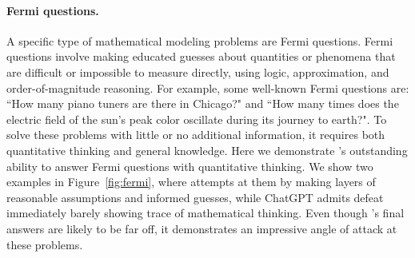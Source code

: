 \begin{comment}
A simple mathematical model to illustrate this could look like this:

Let's assume a company's pre-tax profits are \$100 million and they use robots, leading to a tax bill of \$10 million. The company's post-tax profits would now be \$90 million. If the government were to use this additional revenue to fund social programs, it could result in an increase in the income of lower-income workers.

This simple model assumes that the tax revenue is used effectively to reduce income inequality, which may not always be the case in reality. However, it illustrates the potential impact that taxation on using robots can have on income inequality.
\end{alltt}}
\end{AIbox}
\caption{\DV explain economic and societal impact of AI with a mathematical model.}
\label{fig:my_label}
\end{figure}
\end{comment}

\paragraph{Fermi questions.} A specific type of mathematical modeling problems are Fermi questions. Fermi questions involve making educated guesses about quantities or phenomena that are difficult or impossible to measure directly, using logic, approximation, and order-of-magnitude reasoning. For example, some well-known Fermi questions are: ``How many piano tuners are there in Chicago?" and ``How many times does the electric field of the sun’s peak color oscillate during its journey to earth?". To solve these problems with little or no additional information, it requires both quantitative thinking and general knowledge. Here we demonstrate \DV's outstanding ability to answer Fermi questions with quantitative thinking. We show two examples in Figure~\ref{fig:fermi}, where \DV attempts at them by making layers of reasonable assumptions and informed guesses, while ChatGPT admits defeat immediately barely showing trace of mathematical thinking. Even though \DV's final answers are likely to be far off, it demonstrates an impressive angle of attack at these problems.

